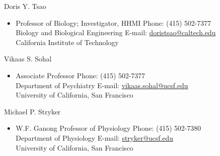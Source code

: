 \documentclass[10pt]{article}
\newenvironment{innerlist}[1][\enskip\textbullet]%
        {\begin{itemize}[#1,leftmargin=*,parsep=0pt,itemsep=0pt,topsep=0pt,partopsep=0pt]}
        {\end{itemize}}
\newcommand{\halfblankline}{\quad\vspace{-0.5\baselineskip}\pagebreak[3]}
\providecommand*\email[1]{\href{mailto:#1}{#1}}
\begin{document}
Doris Y. Tsao
\begin{innerlist}
	
	\item[] Professor of Biology; Investigator, HHMI  \hfill {Phone: (415) 502-7377}
	\\ Biology and Biological Engineering \hfill{E-mail: \email{ doristsao@caltech.edu}}\\
	California Institute of Technology
\end{innerlist}

\halfblankline

Vikaas S. Sohal
\begin{innerlist}

\item[] Associate Professor \hfill {Phone: (415) 502-7377}
\\ Department of Psychiatry \hfill{E-mail: \email{ vikaas.sohal@ucsf.edu}}\\
University of California, San Francisco 
\end{innerlist}

\halfblankline

Michael P. Stryker
\begin{innerlist}
\item[] W.F. Ganong Professor of Physiology \hfill {Phone: (415) 502-7380}\\
Department of Physiology \hfill{E-mail: \email{stryker@ucsf.edu}}
\\University of California, San Francisco 
\end{innerlist}
 
\halfblankline
\end{document}
